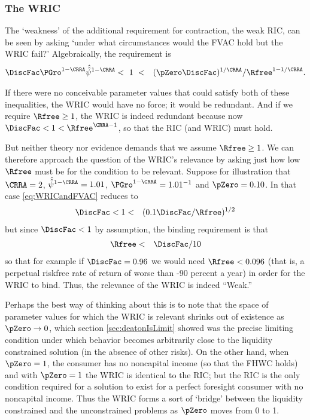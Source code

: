 \documentclass[titlepage]{\econtex}\providecommand{\texname}{BufferStockTheory}
\begin{document}
\subsubsection{The WRIC}

The `weakness' of the additional requirement for contraction, the
weak RIC, can be seen by asking `under what circumstances
would the FVAC hold but the WRIC fail?'
Algebraically, the requirement is
\begin{eqnarray}
 \DiscFac \PGro^{1-\CRRA}\uInvEpShkuInv^{1-\CRRA} & < ~ 1 ~ < & (\pZero \DiscFac)^{1/\CRRA}/\Rfree^{1-1/\CRRA}. \label{eq:WRICandFVAC}
\end{eqnarray}

If there were no conceivable parameter values that could satisfy both
of these inequalities, the WRIC would have no force; it would be
redundant.  And if we require $\Rfree \geq 1$, the WRIC is indeed
redundant because now $\DiscFac <1<\Rfree^{\CRRA-1}$, so that the RIC (and WRIC) must hold.

But neither theory nor evidence demands that we assume $\Rfree \geq
1$.  We can therefore approach the question of the WRIC's relevance by
asking just how low $\Rfree$ must be for the condition to be relevant.
Suppose for illustration that $\CRRA=2$, $\uInvEpShkuInv^{1-\CRRA}=1.01$,
$\PGro^{1-\CRRA}=1.01^{-1}$ and $\pZero = 0.10$.  In that case
\eqref{eq:WRICandFVAC} reduces to
\begin{eqnarray}
  \DiscFac  & < 1 < & (0.1 \DiscFac/\Rfree)^{1/2} \notag
\end{eqnarray}
but since $\DiscFac < 1$ by assumption, the binding requirement is that
\begin{eqnarray}
  \Rfree & < & \DiscFac/10 \notag
\end{eqnarray}
so that for example if $\DiscFac=0.96$ we would need $\Rfree < 0.096$
(that is, a perpetual riskfree rate of return of worse than -90
percent a year) in order for the WRIC to bind.
Thus, the relevance of the WRIC is indeed ``Weak.''

Perhaps the best way of thinking about this is to note that the space
of parameter values for which the WRIC is relevant shrinks out of
existence as $\pZero \rightarrow 0$, which section
\ref{sec:deatonIsLimit} showed was the precise limiting condition
under which behavior becomes arbitrarily close to the liquidity
constrained solution (in the absence of other risks).  On the other
hand, when $\pZero = 1$, the consumer has no noncapital income (so
that the FHWC holds) and with $\pZero=1$ the WRIC is identical to the
RIC; but the RIC is
 the only condition required for a solution to exist
for a perfect foresight consumer with no noncapital income.  Thus the
WRIC forms a sort of `bridge' between the liquidity constrained and
the unconstrained problems as $\pZero$ moves from 0 to 1.
\end{document}
